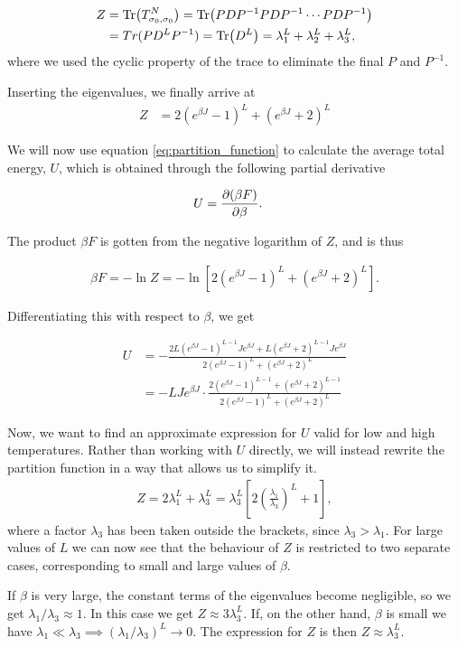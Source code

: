 \documentclass[reprint,english,notitlepage,aps,nobalancelastpage,nofootinbib]{revtex4-1}
\newcommand{\closed}[1]{\left(#1\right)}
\newcommand{\bracket}[1]{\left[#1\right]}
\newcommand{\ebj}{e^{\beta J}}
\renewcommand{\l}{\lambda}
\begin{document}
\begin{align*}
	Z &= \Tr(T_{\sigma_0,\sigma_0}^N) = \Tr(PDP^{-1}PDP^{-1}\cdots PDP^{-1}) \\ 
	&=Tr(P D^L P^{-1})= \Tr(D^L) = \lambda_1^L + \lambda_2^L + \lambda_3^L,
\end{align*}
where we used the cyclic property of the trace to eliminate the final $P$ and $P^{-1}$. 

Inserting the eigenvalues, we finally arrive at 
\begin{align}
	Z &= 2\closed{\ebj - 1}^L + \closed{\ebj+2}^L \label{eq:partition_function}
\end{align}

We will now use equation \eqref{eq:partition_function} to calculate the average total energy, $U$, which is obtained through the following partial derivative  

\begin{align*}
	U &= \pdv{(\beta F)}{\beta}.
\end{align*}

The product $\beta F$ is gotten from the negative logarithm of $Z$, and is thus 

\begin{align*}
	\beta F = -\ln Z = -\ln\bracket{2(\ebj-1)^L + (\ebj+2)^L}.
\end{align*}

Differentiating this with respect to $\beta$, we get

\begin{align}
	U &= -\frac{2L(\ebj-1)^{L-1} J\ebj + L(\ebj+2)^{L-1}J\ebj}{2(\ebj-1)^L + (\ebj+2)^L} \nonumber \\[10pt]
	& = -LJ\ebj \cdot \frac{2(\ebj-1)^{L-1}+(\ebj+2)^{L-1}}{2(\ebj-1)^L + (\ebj+2)^L} \label{eq:avg_tot_en}
\end{align}

Now, we want to find an approximate expression for $U$ valid for low and high temperatures. Rather than working with $U$ directly, we will instead rewrite the partition function in a way that allows us to simplify it. 
\begin{align*}
	Z = 2\l_1^L + \l_3^L = \l_3^L\bracket{2\closed{\frac{\l_1}{\l_3}}^L+1},
\end{align*} 
where a factor $\l_3$ has been taken outside the brackets, since $\l_3>\l_1$. For large values of $L$ we can now see that the behaviour of $Z$ is restricted to two separate cases, corresponding to small and large values of $\beta$. 

If $\beta$ is very large, the constant terms of the eigenvalues become negligible, so we get $\l_1/\l_3\approx1$. In this case we get $Z\approx 3\l_3^L$. If, on the other hand, $\beta$ is small we have $\l_1\ll \l_3 \implies (\l_1/\l_3)^L \to 0$. The expression for $Z$ is then $Z\approx \l_3^L$.  
\end{document}
